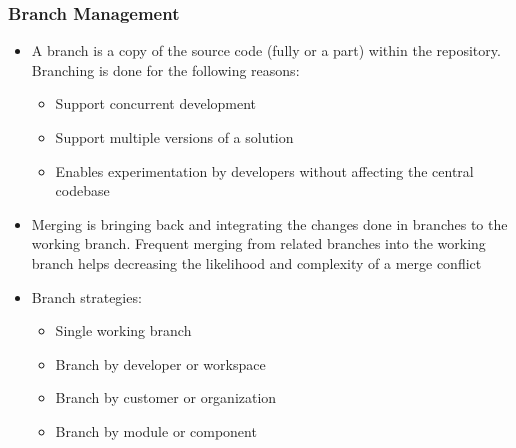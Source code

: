 \documentclass{article}
\begin{document}
\subsubsection{Branch Management}
\begin{itemize}
    \item A branch is a copy of the source code (fully or a part) within the repository. Branching is done for the following reasons:
    \begin{itemize}
        \item Support concurrent development
        
        \item Support multiple versions of a solution
        
        \item Enables experimentation by developers without affecting the central codebase
    \end{itemize}
    
    \item Merging is bringing back and integrating the changes done in branches to the working branch. Frequent merging from related branches into the working branch helps decreasing the likelihood and complexity of a merge conflict
        
    \item Branch strategies:
    \begin{itemize}
        \item Single working branch
            
        \item Branch by developer or workspace
            
        \item Branch by customer or organization
        
        \item Branch by module or component
    \end{itemize}
\end{itemize}
\end{document}

